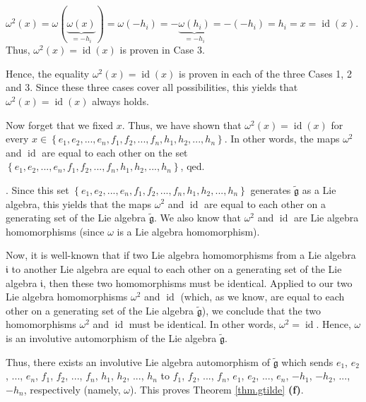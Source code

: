 \documentclass[etingof-lie.tex]{subfiles}
\begin{document}
\begin{verlong}
{$\omega^{2}\left(  x\right)  =\omega\left(  \underbrace{\omega\left(
x\right)  }_{=-h_{i}}\right)  =\omega\left(  -h_{i}\right)
=-\underbrace{\omega\left(  h_{i}\right)  }_{=-h_{i}}=-\left(  -h_{i}\right)
=h_{i}=x=\operatorname*{id}\left(  x\right)  $. Thus, $\omega^{2}\left(
x\right)  =\operatorname*{id}\left(  x\right)  $ is proven in Case 3.
\par
Hence, the equality $\omega^{2}\left(  x\right)  =\operatorname*{id}\left(
x\right)  $ is proven in each of the three Cases 1, 2 and 3. Since these three
cases cover all possibilities, this yields that $\omega^{2}\left(  x\right)
=\operatorname*{id}\left(  x\right)  $ always holds.
\par
Now forget that we fixed $x$. Thus, we have shown that $\omega^{2}\left(
x\right)  =\operatorname*{id}\left(  x\right)  $ for every $x\in\left\{
e_{1},e_{2},...,e_{n},f_{1},f_{2},...,f_{n},h_{1},h_{2},...,h_{n}\right\}  $.
In other words, the maps $\omega^{2}$ and $\operatorname*{id}$ are equal to
each other on the set $\left\{  e_{1},e_{2},...,e_{n},f_{1},f_{2}%
,...,f_{n},h_{1},h_{2},...,h_{n}\right\}  $, qed.}. Since this set $\left\{
e_{1},e_{2},...,e_{n},f_{1},f_{2},...,f_{n},h_{1},h_{2},...,h_{n}\right\}  $
generates $\widetilde{\mathfrak{g}}$ as a Lie algebra, this yields that the
maps $\omega^{2}$ and $\operatorname*{id}$ are equal to each other on a
generating set of the Lie algebra $\widetilde{\mathfrak{g}}$. We also know
that $\omega^{2}$ and $\operatorname*{id}$ are Lie algebra homomorphisms
(since $\omega$ is a Lie algebra homomorphism).

Now, it is well-known that if two Lie algebra homomorphisms from a Lie algebra
$\mathfrak{i}$ to another Lie algebra are equal to each other on a generating
set of the Lie algebra $\mathfrak{i}$, then these two homomorphisms must be
identical. Applied to our two Lie algebra homomorphisms $\omega^{2}$ and
$\operatorname*{id}$ (which, as we know, are equal to each other on a
generating set of the Lie algebra $\widetilde{\mathfrak{g}}$), we conclude
that the two homomorphisms $\omega^{2}$ and $\operatorname*{id}$ must be
identical. In other words, $\omega^{2}=\operatorname*{id}$. Hence, $\omega$ is
an involutive automorphism of the Lie algebra $\widetilde{\mathfrak{g}}$.

Thus, there exists an involutive Lie algebra automorphism of
$\widetilde{\mathfrak{g}}$ which sends $e_{1}$, $e_{2}$, $...$, $e_{n}$,
$f_{1}$, $f_{2}$, $...$, $f_{n}$, $h_{1}$, $h_{2}$, $...$, $h_{n}$ to $f_{1}$,
$f_{2}$, $...$, $f_{n}$, $e_{1}$, $e_{2}$, $...$, $e_{n}$, $-h_{1}$, $-h_{2}$,
$...$, $-h_{n}$, respectively (namely, $\omega$). This proves Theorem
\ref{thm.gtilde} \textbf{(f)}.
\end{verlong}
\end{document}
